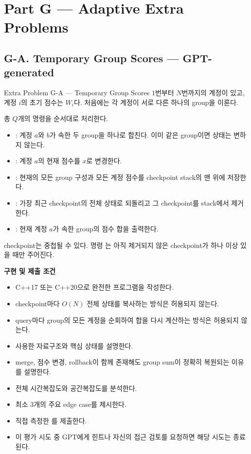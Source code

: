 \section{Part G --- Adaptive Extra Problems}

\subsection{G-A. Temporary Group Scores --- GPT-generated}

\begin{problembox}{Extra Problem G-A --- Temporary Group Scores}
$1$번부터 $N$번까지의 계정이 있고, 계정 $i$의 초기 점수는 $W_i$다. 처음에는 각 계정이 서로 다른 하나의 group을 이룬다.

총 $Q$개의 명령을 순서대로 처리한다.
\begin{itemize}
\item {}: 계정 $a$와 $b$가 속한 두 group을 하나로 합친다. 이미 같은 group이면 상태는 변하지 않는다.
\item {}: 계정 $a$의 현재 점수를 $x$로 변경한다.
\item {}: 현재의 모든 group 구성과 모든 계정 점수를 checkpoint stack의 맨 위에 저장한다.
\item {}: 가장 최근 checkpoint의 전체 상태로 되돌리고 그 checkpoint를 stack에서 제거한다.
\item {}: 현재 계정 $a$가 속한 group의 점수 합을 출력한다.
\end{itemize}

checkpoint는 중첩될 수 있다. 명령 는 아직 제거되지 않은 checkpoint가 하나 이상 있을 때만 주어진다.

\textbf{구현 및 제출 조건}
\begin{itemize}
\item C++17 또는 C++20으로 완전한 프로그램을 작성한다.
\item checkpoint마다 $O(N)$ 전체 상태를 복사하는 방식은 허용되지 않는다.
\item query마다 group의 모든 계정을 순회하여 합을 다시 계산하는 방식은 허용되지 않는다.
\item 사용한 자료구조와 핵심 상태를 설명한다.
\item merge, 점수 변경, rollback이 함께 존재해도 group sum이 정확히 복원되는 이유를 설명한다.
\item 전체 시간복잡도와 공간복잡도를 분석한다.
\item 최소 3개의 주요 edge case를 제시한다.
\item 직접 측정한 를 제출한다.
\item 이 평가 시도 중 GPT에게 힌트나 자신의 접근 검토를 요청하면 해당 시도는 종료된다.
\end{itemize}


\end{problembox}

